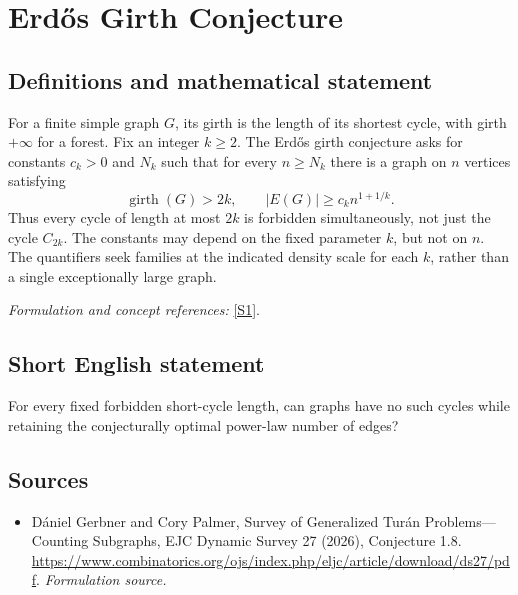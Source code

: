\documentclass[11pt]{article}
\begin{document}
\section*{\texorpdfstring{Erdős Girth Conjecture}{Erdős Girth Conjecture}}\label{30006856}
\subsection{Definitions and mathematical statement}
For a finite simple graph $G$, its girth is the length of its shortest cycle, with girth $+\infty$ for a forest. Fix an integer $k\ge2$. The Erd\H{o}s girth conjecture asks for constants $c_k>0$ and $N_k$ such that for every $n\ge N_k$ there is a graph on $n$ vertices satisfying
\[
 \operatorname{girth}(G)>2k,
 \qquad |E(G)|\ge c_k n^{1+1/k}.
\]
Thus every cycle of length at most $2k$ is forbidden simultaneously, not just the cycle $C_{2k}$. The constants may depend on the fixed parameter $k$, but not on $n$. The quantifiers seek families at the indicated density scale for each $k$, rather than a single exceptionally large graph.
\par\smallskip\textit{Formulation and concept references:} \href{https://www.combinatorics.org/ojs/index.php/eljc/article/download/ds27/pdf}{[S1]}.

\subsection{Short English statement}
For every fixed forbidden short-cycle length, can graphs have no such cycles while retaining the conjecturally optimal power-law number of edges?
\subsection{Sources}
\begin{itemize}
\item[S1]Dániel Gerbner and Cory Palmer, Survey of Generalized Turán Problems—Counting Subgraphs, EJC Dynamic Survey 27 (2026), Conjecture 1.8.
\url{https://www.combinatorics.org/ojs/index.php/eljc/article/download/ds27/pdf}.
\textit{Formulation source.}
\end{itemize}
\end{document}
